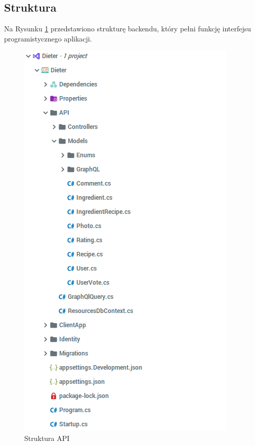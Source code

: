 \subsection{Struktura}
Na Rysunku \ref{fig:struct_api} przedstawiono strukturę backendu, który pełni funkcję interfejsu programistycznego aplikacji.
\begin{figure}[H]
\centering
\includegraphics[width=.5\textwidth]{rys/struktura-api.png}
\caption{Struktura API}
\label{fig:struct_api}
\end{figure}

